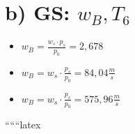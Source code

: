 \section*{b) GS: $w_B, T_6$}

\begin{itemize}
    \item $w_B = \frac{w_s \cdot p_s}{p_0} = 2,678$
    \item $w_B = w_s \cdot \frac{p_s}{p_0} = 84,04 \frac{m}{s}$
    \item $w_B = w_s \cdot \frac{p_s}{p_0} = 575,96 \frac{m}{s}$
\end{itemize}

``````latex